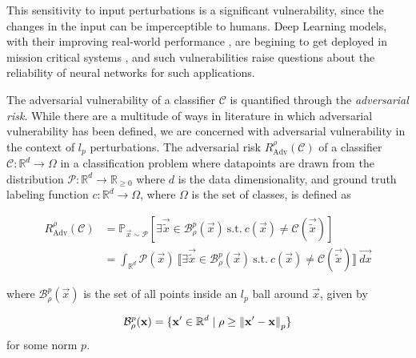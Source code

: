\documentclass{ociamthesis}
\begin{document}
This sensitivity to input perturbations is a significant vulnerability, since
the changes in the input can be imperceptible to humans. Deep Learning models,
with their improving real-world performance
\citep{imagenet,imagenet-superhuman}, are begining to get deployed in mission
critical systems \citep{adv-vuln-in-mission-critical}, and such vulnerabilities
raise questions about the reliability of neural networks for such applications.

The adversarial vulnerability of a classifier $\mathcal{C}$ is quantified
through the \emph{adversarial risk}. While there are a multitude of ways in
literature in which adversarial vulnerability has been defined, we are concerned
with adversarial vulnerability in the context of $l_p$ perturbations. The
adversarial risk $R_{\text{Adv}}^{\rho}(\mathcal{C}) $ of a classifier
$\mathcal{C}: \mathbb{R}^d \to \Omega$ in a classification problem where
datapoints are drawn from the distribution $\mathcal{P}: \mathbb{R}^d \to
\mathbb{R}_{\geq 0}$ where $d$ is the data dimensionality, and ground truth
labeling function $c: \mathbb{R}^d \to \Omega$, where $\Omega$ is the set of
classes, is defined as

\begin{equation} \label{eq:adv-risk}
    \begin{split}
    R_{\text{Adv}}^{\rho}(\mathcal{C}) & = \mathbb{P}_{\vec{x} \sim \mathcal{P}}
    [\exists \vec{\tilde{x}} \in \mathcal{B}_\rho^p(\vec{x})~\text{s.t.}~c(\vec{x}) \neq \mathcal{C}(\vec{\tilde{x}})] \\
    & = \int_{\mathbb{R}^d} \mathcal{P}(\vec{x})
    ~\llbracket \exists \vec{\tilde{x}} \in \mathcal{B}_\rho^p(\vec{x})~\text{s.t.}~c(\vec{x}) \neq \mathcal{C}(\vec{\tilde{x}}) \rrbracket~\vec{dx}
    \end{split}
\end{equation}

where $\mathcal{B}_\rho^p(\vec{x})$ is the set of all points inside an $l_p$
ball around $\vec{x}$, given by 

\begin{equation*}
    \mathcal{B}_\rho^p({\mathbf{x}}) = \{{\mathbf{x'}} \in
    \mathbb{R}^d \mid \rho \geq \mathrm{\left\lVert{\mathbf{x'}} - {\mathbf{x}}\right\rVert}_p\}
\end{equation*}
for some norm $p$.
\end{document}
